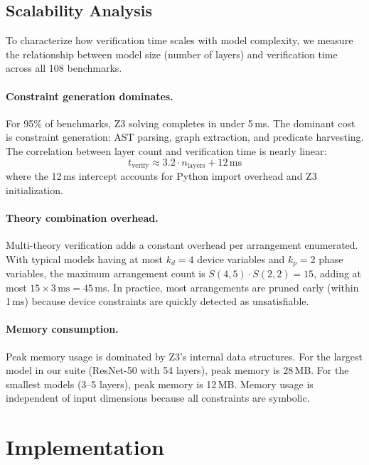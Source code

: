 \documentclass[10pt]{article}
\theoremstyle{plain}
\theoremstyle{definition}
\theoremstyle{remark}
\begin{document}
\subsection{Scalability Analysis}\label{sec:scalability}

To characterize how verification time scales with model complexity,
we measure the relationship between model size (number of layers)
and verification time across all 108 benchmarks.

\paragraph{Constraint generation dominates.}
For 95\% of benchmarks, Z3 solving completes in under 5\,ms.  The
dominant cost is constraint generation: AST parsing, graph
extraction, and predicate harvesting.  The correlation between
layer count and verification time is nearly linear:
\[
  t_{\text{verify}} \approx 3.2 \cdot n_{\text{layers}} + 12\,\text{ms}
\]
where the 12\,ms intercept accounts for Python import overhead and
Z3 initialization.

\paragraph{Theory combination overhead.}
Multi-theory verification adds a constant overhead per arrangement
enumerated.  With typical models having at most $k_d = 4$ device
variables and $k_p = 2$ phase variables, the maximum arrangement
count is $S(4, 5) \cdot S(2, 2) = 15$, adding at most
$15 \times 3\,\text{ms} = 45$\,ms.  In practice, most arrangements
are pruned early (within 1\,ms) because device constraints are
quickly detected as unsatisfiable.

\paragraph{Memory consumption.}
Peak memory usage is dominated by Z3's internal data structures.
For the largest model in our suite (ResNet-50 with 54 layers),
peak memory is 28\,MB.  For the smallest models (3--5 layers),
peak memory is 12\,MB.  Memory usage is independent of input
dimensions because all constraints are symbolic.


\section{Implementation}\label{sec:implementation}
\end{document}
